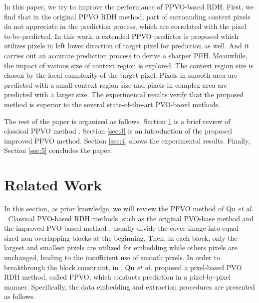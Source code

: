 \documentclass[review,3p,10pt,sort&compress]{elsarticle}
\begin{document}
In this paper, we try to improve the performance of PPVO-based RDH. First, we find that in the original PPVO RDH method, part of surrounding context pixels do not appreciate in the prediction process, which are correlated with the pixel to-be-predicted. In this work, a extended PPVO predictor is proposed which utilizes pixels in left lower direction of target pixel for prediction as well. And it carries out an accurate prediction process to derive a sharper PEH. Meanwhile, the impact of various size of context region is explored. The context region size is chosen by the local complexity of the target pixel. Pixels in smooth area are predicted with a small context region size and pixels in complex area are predicted with a larger size. The experimental results verify that the proposed method is superior to the several state-of-the-art PVO-based methods.

The rest of the paper is organized as follows. Section \ref{sec:2} is a brief review of classical PPVO method \cite{Qu2015PPVO}. Section \ref{sec:3} is an introduction of the proposed improved PPVO method. Section \ref{sec:4} shows the experimental results. Finally, Section \ref{sec:5} concludes the paper.

\section{Related Work}\label{sec:2}
In this section, as prior knowledge, we will review the PPVO method of Qu \emph{et al.} \cite{Qu2015PPVO}. Classical PVO-based RDH methods, such as the original PVO-base method \cite{Li2013PVO} and the improved PVO-based method \cite{Peng2014IPVO}, usually divide the cover image into equal-sized non-overlapping blocks at the beginning. Then, in each block, only the largest and smallest pixels are utilized for embedding while others pixels are unchanged, leading to the insufficient use of smooth pixels. In order to breakthrough the block constraint, in \cite{Qu2015PPVO}, Qu \emph{et al.} proposed a pixel-based PVO RDH method, called PPVO, which conducts prediction in a pixel-by-pixel manner. Specifically, the data embedding and extraction procedures are presented as follows.
\end{document}
